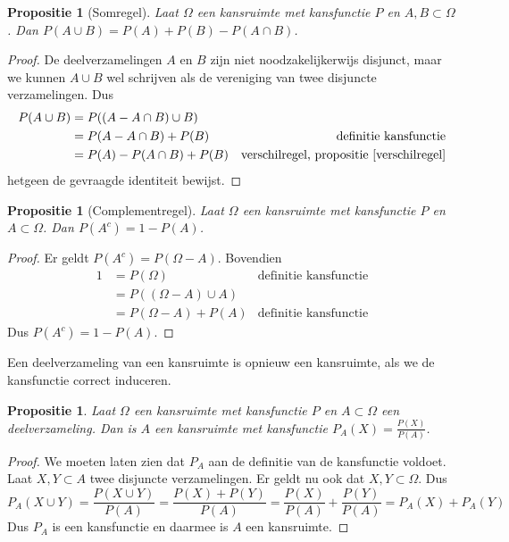 \documentclass[a4paper]{report}
\newtheorem{proposition}[theorem]{Propositie}
\theoremstyle{definition}
\begin{document}
\begin{proposition}[Somregel]
    \label{somregel}
    Laat $\Omega$ een kansruimte met kansfunctie $P$ en $A,B \subset \Omega$.
    Dan $P(A \cup B) = P(A) + P(B) - P(A \cap B)$.
\end{proposition}
\begin{proof}
    De deelverzamelingen $A$ en $B$ zijn niet noodzakelijkerwijs disjunct, maar we kunnen $A \cup B$ wel schrijven als de vereniging van twee disjuncte verzamelingen.
    Dus
    \begin{align*}
        P(A \cup B)     &= P( (A - A \cap B) \cup B) \\
                        &= P(A - A \cap B) + P(B)  & \text{definitie kansfunctie}\\
                        &= P(A) - P(A \cap B) + P(B) & \text{verschilregel, propositie~\ref{verschilregel}}
    \end{align*}
    hetgeen de gevraagde identiteit bewijst.
\end{proof}

\begin{proposition}[Complementregel]
    \label{complementregel}
    Laat $\Omega$ een kansruimte met kansfunctie $P$ en $A \subset \Omega$.
    Dan $P(A^c) = 1 - P(A)$.
\end{proposition}
\begin{proof}
    Er geldt $P(A^c) = P(\Omega - A)$.
    Bovendien
    \begin{align*}
        1 &= P(\Omega) & \text{definitie kansfunctie}\\
          &= P( (\Omega - A) \cup A) \\
          &= P(\Omega - A) + P(A) & \text{definitie kansfunctie}
    \end{align*}
    Dus $P(A^c) = 1 - P(A)$.
\end{proof}

Een deelverzameling van een kansruimte is opnieuw een kansruimte, als we de kansfunctie correct induceren.
\begin{proposition}
    Laat $\Omega$ een kansruimte met kansfunctie $P$ en $A \subset \Omega$ een deelverzameling.
    Dan is $A$ een kansruimte met kansfunctie $P_A(X) = \frac{P(X)}{P(A)}$.
\end{proposition}
\begin{proof}
    We moeten laten zien dat $P_A$ aan de definitie van de kansfunctie voldoet.
    Laat $X,Y \subset A$ twee disjuncte verzamelingen.
    Er geldt nu ook dat $X,Y \subset \Omega$.
    Dus \[ P_A(X \cup Y) = \frac{P(X \cup Y)}{P(A)} = \frac{P(X) + P(Y)}{P(A)} = \frac{P(X)}{P(A)} + \frac{P(Y)}{P(A)} = P_A(X) + P_A(Y) \]
    Dus $P_A$ is een kansfunctie en daarmee is $A$ een kansruimte.
\end{proof}
\end{document}

